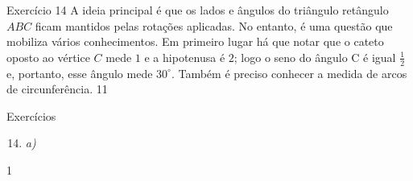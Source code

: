 \begin{sugestions}{Exercício 14}
{
A ideia principal é que os lados e ângulos do triângulo retângulo $ABC$ ficam mantidos pelas rotações aplicadas. No entanto, é uma questão que mobiliza vários conhecimentos. Em primeiro lugar há que notar que o cateto oposto ao vértice $C$ mede $1$ e a hipotenusa é $2$; logo o seno do ângulo C é igual $\frac{1}{2}$ e, portanto, esse ângulo mede $30^{\circ}$. Também é preciso conhecer a medida de arcos de circunferência.
}{1}{1}
\end{sugestions}
\begin{answer}{Exercícios}
{\exerciselist
\begin{enumerate}\setcounter{enumi}{13}
\item \textit{a)}
\end{enumerate}
}{1}
\end{answer}

